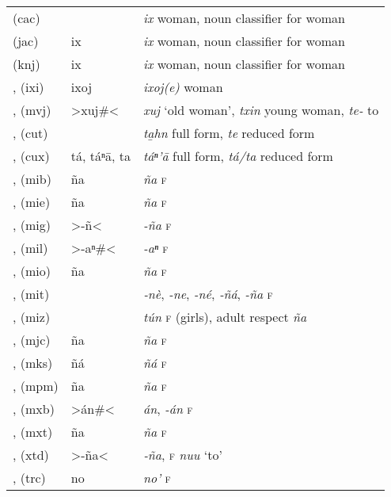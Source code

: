 {\begin{longtable}{L{.25\textwidth}L{.25\textwidth}L{.5\textwidth}}
 (cac)	&		&	\textit{\textquotesingle{}ix} woman, noun classifier for woman	\\
 (jac)	&	ix	&	\textit{ix} woman, noun classifier for woman	\\
 (knj)	&	ix	&	\textit{ix} woman, noun classifier for woman	\\
,  (ixi)	&	ixoj	&	\textit{ixoj(e)} woman	\\
,  (mvj)	&	>xuj\#<	&	\textit{xuj} ‘old woman’, \textit{txin} young woman, \textit{te-} to	\\
,  (cut)	&		&	\textit{ta̱hn} full form, \textit{te} reduced form	\\
,  (cux)	&	tá, táⁿ\textquotesingle{}ā, ta	&	\textit{táⁿ’ā} full form, \textit{tá/ta} reduced form	\\
,  (mib)	&	ña	&	\textit{ña} \textsc{f}	\\
,  (mie)	&	ña	&	\textit{ña} \textsc{f}	\\
,  (mig)	&	>-ñ<	&	\textit{-ña} \textsc{f}	\\
,  (mil)	&	>-aⁿ\#<	&	\textit{-aⁿ} \textsc{f}	\\
,  (mio)	&	ña	&	\textit{ña} \textsc{f}	\\
,  (mit)	&		&	\textit{‑nè}, \textit{-ne}, \textit{-né}, \textit{‑ñá}, \textit{-ña} \textsc{f}	\\
,  (miz)	&		&	\textit{tún} \textsc{f} (girls), adult respect \textit{ña}	\\
,  (mjc)	&	ña	&	\textit{ña} \textsc{f}	\\
,  (mks)	&	ñá	&	\textit{ñá} \textsc{f}	\\
,  (mpm)	&	ña	&	\textit{ña} \textsc{f}	\\
,  (mxb)	&	>án\#<	&	\textit{án}, \textit{-án} \textsc{f}	\\
,  (mxt)	&	ña	&	\textit{ña} \textsc{f}	\\
,  (xtd)	&	>-ña<	&	\textit{‑ña}, \textsc{f} \textit{nuu} ‘to’	\\
,  (trc)	&	no\textquotesingle{}	&	\textit{no’} \textsc{f}	\\

\end{longtable}}
